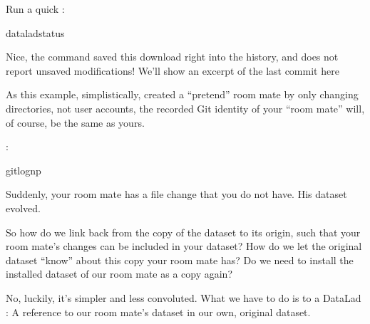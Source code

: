 \sphinxAtStartPar
Run a quick :

\begin{sphinxVerbatim}[commandchars=\\\{\}]
dataladstatus
\end{sphinxVerbatim}

\sphinxAtStartPar
Nice, the  command saved this download
right into the history, and  does not report
unsaved modifications! We’ll show an excerpt of the last commit
here%
\begin{footnote}\sphinxAtStartFootnote
As this example, simplistically, created a “pretend” room mate by only changing directories, not user accounts, the recorded Git identity of your “room mate” will, of course, be the same as yours.
%
\end{footnote}:

\begin{sphinxVerbatim}[commandchars=\\\{\}]
gitlog\PYGZhy{}n\PYGZhy{}p


\end{sphinxVerbatim}

\sphinxAtStartPar
Suddenly, your room mate has a file change that you do not have.
His dataset evolved.

\sphinxAtStartPar
So how do we link back from the copy of the dataset to its
origin, such that your room mate’s changes can be included in
your dataset? How do we let the original dataset “know” about
this copy your room mate has?
Do we need to install the installed dataset of our room mate
as a copy again?

\sphinxAtStartPar
No, luckily, it’s simpler and less convoluted. What we have to
do is to  a DataLad {\hyperref[\detokenize{glossary:term-sibling}]{}}: A reference to our room mate’s
dataset in our own, original dataset.

